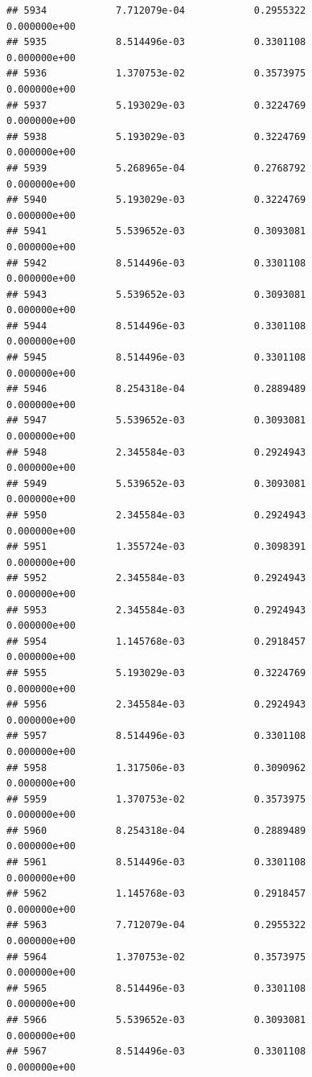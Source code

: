 \documentclass[
]{article}
\begin{document}
\begin{verbatim}
## 5934            7.712079e-04            0.2955322            0.000000e+00
## 5935            8.514496e-03            0.3301108            0.000000e+00
## 5936            1.370753e-02            0.3573975            0.000000e+00
## 5937            5.193029e-03            0.3224769            0.000000e+00
## 5938            5.193029e-03            0.3224769            0.000000e+00
## 5939            5.268965e-04            0.2768792            0.000000e+00
## 5940            5.193029e-03            0.3224769            0.000000e+00
## 5941            5.539652e-03            0.3093081            0.000000e+00
## 5942            8.514496e-03            0.3301108            0.000000e+00
## 5943            5.539652e-03            0.3093081            0.000000e+00
## 5944            8.514496e-03            0.3301108            0.000000e+00
## 5945            8.514496e-03            0.3301108            0.000000e+00
## 5946            8.254318e-04            0.2889489            0.000000e+00
## 5947            5.539652e-03            0.3093081            0.000000e+00
## 5948            2.345584e-03            0.2924943            0.000000e+00
## 5949            5.539652e-03            0.3093081            0.000000e+00
## 5950            2.345584e-03            0.2924943            0.000000e+00
## 5951            1.355724e-03            0.3098391            0.000000e+00
## 5952            2.345584e-03            0.2924943            0.000000e+00
## 5953            2.345584e-03            0.2924943            0.000000e+00
## 5954            1.145768e-03            0.2918457            0.000000e+00
## 5955            5.193029e-03            0.3224769            0.000000e+00
## 5956            2.345584e-03            0.2924943            0.000000e+00
## 5957            8.514496e-03            0.3301108            0.000000e+00
## 5958            1.317506e-03            0.3090962            0.000000e+00
## 5959            1.370753e-02            0.3573975            0.000000e+00
## 5960            8.254318e-04            0.2889489            0.000000e+00
## 5961            8.514496e-03            0.3301108            0.000000e+00
## 5962            1.145768e-03            0.2918457            0.000000e+00
## 5963            7.712079e-04            0.2955322            0.000000e+00
## 5964            1.370753e-02            0.3573975            0.000000e+00
## 5965            8.514496e-03            0.3301108            0.000000e+00
## 5966            5.539652e-03            0.3093081            0.000000e+00
## 5967            8.514496e-03            0.3301108            0.000000e+00

\end{verbatim}
\end{document}
